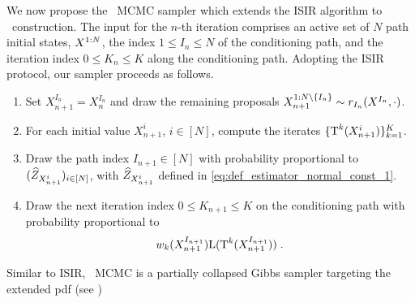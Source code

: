 \documentclass{article}
\begin{document}
 We now propose the \IFIS\ MCMC sampler which extends the ISIR algorithm to \IFIS\ construction.  The input for the $n$-th iteration comprises an active set  of $N$ path initial states,  $X^{1:N}$, the index $1\le I_n\le N$ of the conditioning path, and the iteration index $0\le K_n\le K$ along the conditioning path. %
Adopting the ISIR protocol, our sampler proceeds as follows.
\begin{enumerate}
\item Set  $X_{n+1}^{I_n}= X_n^{I_n}$ and draw the remaining proposals $X_{n+1}^{1:N \setminus \{I_{n}\}} \sim r_{I_n}(X^{I_n},\cdot)$.
\item For each initial value $X_{n+1}^i$, $i \in [N]$, compute the iterates $\{ \operatorname{T}^k(X_{n+1}^i) \}_{k=1}^K$.
\item Draw the path index $I_{n+1}  \in [N]$  with probability proportional to  $(\widehat{Z}_{X_{n+1}^{i}})_{i \in [N]}$, with $\widehat{Z}_{X_{n+1}^{i}}$ defined in  \eqref{eq:def_estimator_normal_const_1}.
\item Draw the next iteration  index $0\le K_{n+1} \le K$ on the conditioning path with probability proportional to
\[
w_k(X^{I_{n+1}}_{n+1})\mathrm{L}(\operatorname{T}^k(X^{I_{n+1}}_{n+1})) \;.
\]
\end{enumerate}
Similar to ISIR, \IFIS\ MCMC is a partially collapsed Gibbs sampler targeting the extended pdf (see ) %
\end{document}
